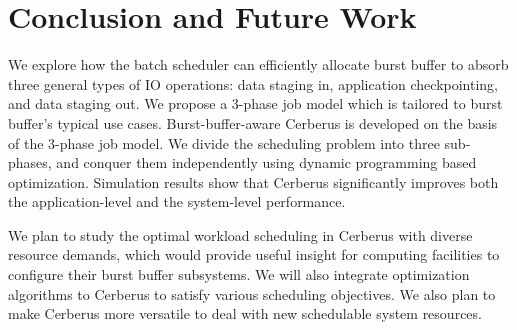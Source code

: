 \section{Conclusion and Future Work}
\label{Sec:Conclusion}

We explore how the batch scheduler can efficiently allocate burst buffer to absorb three general types of IO operations:
data staging in, application checkpointing, and data staging out.
We propose a 3-phase job model which is tailored to burst buffer's typical use cases.
Burst-buffer-aware Cerberus is developed on the basis of the 3-phase job model.
We divide the scheduling problem into three sub-phases, and conquer them independently using dynamic programming based optimization.
Simulation results show that Cerberus significantly improves both the application-level and the system-level performance.

We plan to study the optimal workload scheduling in Cerberus with diverse resource demands,
which would provide useful insight for computing facilities to configure their burst buffer subsystems.
We will also integrate optimization algorithms to Cerberus to satisfy various scheduling objectives.
We also plan to make Cerberus more versatile to deal with new schedulable system resources.

